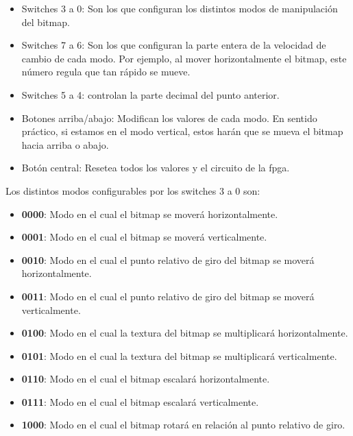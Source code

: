 \begin{itemize}
\item Switches 3 a 0: Son los que configuran los distintos modos de manipulación del bitmap.
\item Switches 7 a 6: Son los que configuran la parte entera de la velocidad de cambio de cada modo. Por ejemplo, al mover horizontalmente el bitmap, este número regula que tan rápido se mueve.
\item Switches 5 a 4: controlan la parte decimal del punto anterior.
\item Botones arriba/abajo: Modifican los valores de cada modo. En sentido práctico, si estamos en el modo vertical, estos harán que se mueva el bitmap hacia arriba o abajo.
\item Botón central: Resetea todos los valores y el circuito de la fpga.
\end{itemize}

Los distintos modos configurables por los switches 3 a 0 son:
\begin{itemize}
\item \textbf{0000}: Modo en el cual el bitmap se moverá horizontalmente.
\item \textbf{0001}: Modo en el cual el bitmap se moverá verticalmente.
\item \textbf{0010}: Modo en el cual el punto relativo de giro del bitmap se moverá horizontalmente.
\item \textbf{0011}: Modo en el cual el punto relativo de giro del bitmap se moverá verticalmente.
\item \textbf{0100}: Modo en el cual la textura del bitmap se multiplicará horizontalmente.
\item \textbf{0101}: Modo en el cual la textura del bitmap se multiplicará verticalmente.
\item \textbf{0110}: Modo en el cual el bitmap escalará horizontalmente.
\item \textbf{0111}: Modo en el cual el bitmap escalará verticalmente.
\item \textbf{1000}: Modo en el cual el bitmap rotará en relación al punto relativo de giro.
\end{itemize}

